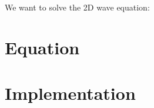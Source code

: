 We want to solve the 2D wave equation:


\section{Equation} \label{section:spectral_element_method:equation}

\section{Implementation} \label{section:spectral_element_method:implementation}
